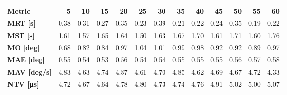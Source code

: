 \begin{tabular*}{\textwidth}{@{\extracolsep{\fill}}l|rrrrrrrrrrrr}
    \toprule
    \textbf{Metric} & \textbf{5} & \textbf{10} & \textbf{15} & \textbf{20} & \textbf{25} & \textbf{30} & \textbf{35} & \textbf{40} & \textbf{45} & \textbf{50} & \textbf{55} & \textbf{60} \\
    \midrule
    \textbf{MRT [s]} & 0.38 & 0.31 & 0.27 & 0.35 & 0.23 & 0.39 & 0.21 & 0.22 & 0.24 & 0.35 & 0.19 & 0.22 \\
    \textbf{MST [s]} & 1.61 & 1.57 & 1.65 & 1.64 & 1.50 & 1.63 & 1.67 & 1.70 & 1.61 & 1.71 & 1.60 & 1.76 \\
    \textbf{MO  [deg]} & 0.68 & 0.82 & 0.84 & 0.97 & 1.04 & 1.01 & 0.99 & 0.98 & 0.92 & 0.92 & 0.89 & 0.97 \\
    \textbf{MAE [deg]} & 0.55 & 0.54 & 0.53 & 0.56 & 0.54 & 0.54 & 0.55 & 0.55 & 0.55 & 0.56 & 0.57 & 0.58 \\
    \textbf{MAV [deg/s]} & 4.83 & 4.63 & 4.74 & 4.87 & 4.61 & 4.70 & 4.85 & 4.62 & 4.69 & 4.67 & 4.72 & 4.33 \\
    \textbf{NTV [\si{\micro\second}]} & 4.72 & 4.67 & 4.64 & 4.78 & 4.80 & 4.73 & 4.74 & 4.76 & 4.91 & 5.02 & 5.00 & 5.07 \\
    \bottomrule
\end{tabular*}

